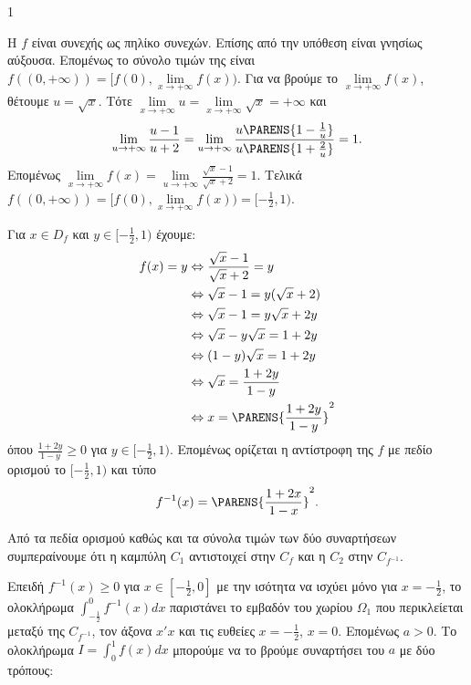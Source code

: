 \begin{ylh}{1}
    \item [Συναρτήσεις - Ολοκληρωτικός Λογισμός]
\end{ylh}
\begin{alist}
    \item Η $f$ είναι συνεχής ως πηλίκο συνεχών. Επίσης από την υπόθεση είναι γνησίως αύξουσα.
    Επομένως το σύνολο τιμών της είναι $f((0,+\infty))=[f(0),\lim\limits_{x\to +\infty}f(x))$.
    Για να βρούμε το $\lim\limits_{x\to +\infty}f(x)$, θέτουμε $u=\sqrt{x}$. Τότε $\lim\limits_{x\to +\infty}u=\lim\limits_{x\to +\infty}\sqrt{x}=+\infty$ και
    \[ \lim_{u\to +\infty}\frac{u-1}{u+2} = \lim_{u\to +\infty}\frac{u\PARENS{1-\frac{1}{u}}}{u\PARENS{1+\frac{2}{u}}} = 1 . \]
    Επομένως $\lim\limits_{x\to +\infty}f(x) = \lim\limits_{u\to +\infty}\frac{\sqrt{x}-1}{\sqrt{x}+2} = 1$.
    Τελικά $f((0,+\infty))=[f(0),\lim\limits_{x\to +\infty}f(x))=[-\frac{1}{2},1)$. 

    \item Για $x\in D_f$ και $y\in[-\frac{1}{2},1)$ έχουμε:
    \[
    \begin{aligned}
        f(x)=y & \Leftrightarrow \frac{\sqrt{x}-1}{\sqrt{x}+2}=y \\
        & \Leftrightarrow \sqrt{x}-1=y(\sqrt{x}+2) \\
        & \Leftrightarrow \sqrt{x}-1=y\sqrt{x}+2y \\
        & \Leftrightarrow \sqrt{x}-y\sqrt{x}=1+2y \\
        & \Leftrightarrow (1-y)\sqrt{x}=1+2y \\
        & \Leftrightarrow \sqrt{x}=\frac{1+2y}{1-y} \\
        & \Leftrightarrow x=\PARENS{\frac{1+2y}{1-y}}^2
    \end{aligned}
    \]
    όπου $\frac{1+2y}{1-y} \ge 0$ για $y\in[-\frac{1}{2},1)$.
    Επομένως ορίζεται η αντίστροφη της $f$ με πεδίο ορισμού το $[-\frac{1}{2},1)$ και τύπο
    \[ f^{-1}(x) = \PARENS{\frac{1+2x}{1-x}}^2 . \] 

    \item
    \begin{rlist}
        \item Από τα πεδία ορισμού καθώς και τα σύνολα τιμών των δύο συναρτήσεων
        συμπεραίνουμε ότι η καμπύλη $C_1$ αντιστοιχεί στην $C_f$ και η $C_2$ στην $C_{f^{-1}}$. 

        \item Επειδή $f^{-1}(x)\ge 0$ για $x\in[-\frac{1}{2},0]$ με την ισότητα να ισχύει μόνο για $x=-\frac{1}{2}$,
        το ολοκλήρωμα $\int_{-\frac{1}{2}}^{0}f^{-1}(x)dx$ παριστάνει το εμβαδόν του χωρίου $\Omega_1$ που
        περικλείεται μεταξύ της $C_{f^{-1}}$, τον άξονα $x'x$ και τις ευθείες $x=-\frac{1}{2}$, $x=0$.
        Επομένως $a>0$.
        Το ολοκλήρωμα $I=\int_{0}^{1}f(x)dx$ μπορούμε να το βρούμε συναρτήσει του $a$ με δύο
        τρόπους:


\end{rlist}
\end{alist}
